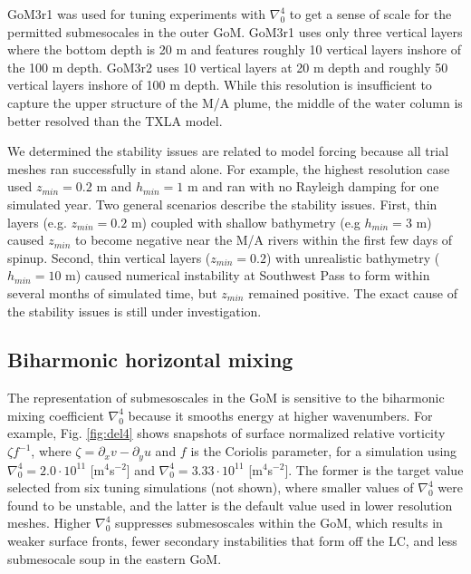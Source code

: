 GoM3r1 was used for tuning experiments with $\nabla_0^4$ to get a sense of scale for the permitted submesocales in the outer GoM. GoM3r1 uses only three vertical layers where the bottom depth is 20 m and features roughly 10 vertical layers inshore of the 100 m depth. GoM3r2 uses 10 vertical layers at 20 m depth and roughly 50 vertical layers inshore of 100 m depth. While this resolution is insufficient to capture the upper structure of the M/A plume, the middle of the water column is better resolved than the TXLA model.

We determined the stability issues are related to model forcing because all trial meshes ran successfully in stand alone. For example, the highest resolution case used $z_{min} = 0.2$ m and $h_{min} = 1$ m and ran with no Rayleigh damping for one simulated year. Two general scenarios describe the stability issues. First, thin layers (e.g. $z_{min} = 0.2$ m) coupled with shallow bathymetry (e.g $h_{min}=3$ m) caused $z_{min}$ to become negative near the M/A rivers within the first few days of spinup. Second, thin vertical layers ($z_{min} = 0.2$) with unrealistic bathymetry ($h_{min}=10$ m) caused numerical instability at Southwest Pass to form within several months of simulated time, but $z_{min}$ remained positive. The exact cause of the stability issues is still under investigation. 

\subsection{Biharmonic horizontal mixing}
The representation of submesoscales in the GoM is sensitive to the biharmonic mixing coefficient $\nabla_0^4$ because it smooths energy at higher wavenumbers. For example, Fig. \ref{fig:del4} shows snapshots of surface normalized relative vorticity $\zeta f^{-1}$, where $\zeta = \partial_x v - \partial_y u$ and $f$ is the Coriolis parameter, for a simulation using $\nabla_0^4=2.0 \cdot 10^{11}$ [m$^4$s$^{-2}$] and $\nabla_0^4=3.33 \cdot 10^{11}$ [m$^4$s$^{-2}$]. The former is the target value selected from six tuning simulations (not shown), where smaller values of $\nabla_0^4$ were found to be unstable, and the latter is the default value used in lower resolution meshes. Higher $\nabla_0^4$ suppresses submesoscales within the GoM, which results in weaker surface fronts, fewer secondary instabilities that form off the LC, and less submesocale soup in the eastern GoM. 

